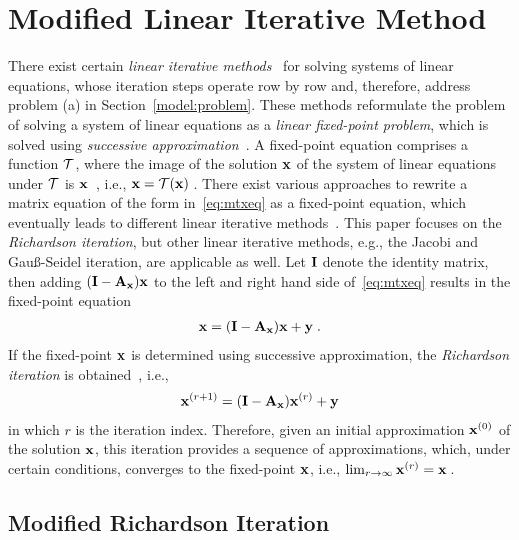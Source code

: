 \documentclass[10pt,twocolumn,twoside]{IEEEtran}
\begin{document}
\section{Modified Linear Iterative Method}
	\label{mlim}

There exist certain \emph{linear iterative methods}~\cite{kelley1995, isaacson1994, saad2003}
for solving systems of linear equations, whose iteration steps operate
row by row and, therefore, address problem (a) in Section~\ref{model:problem}.
These methods reformulate the problem of solving a system of linear
equations as a \emph{linear fixed-point problem}, which is solved using \emph{successive
approximation}~\cite{kelley1995}. A fixed-point equation comprises a function $\mathcal{T}$, where
the image of the solution $\bm{\mathrm{x}}$ of the system of linear equations under $\mathcal{T}$
is $\bm{\mathrm{x}}$~\cite{kelley1995}, i.e., $\bm{\mathrm{x}} = \mathcal{T}(\bm{\mathrm{x}})\:$.
There exist various approaches to rewrite a matrix equation of the form
in~\eqref{eq:mtxeq} as a fixed-point equation,
which eventually leads to different linear iterative methods~\cite{kelley1995,isaacson1994,saad2003}.
This paper focuses on the \emph{Richardson iteration},
but other linear iterative methods, e.g., the Jacobi and Gau\ss-Seidel iteration,
are applicable as well. Let $\bm{\mathrm{I}}$ denote the identity matrix, then
adding $(\bm{\mathrm{I}}-\bm{\mathrm{A}}_{\bm{\mathrm{x}}})\bm{\mathrm{x}}$ to the left and right hand side
of~\eqref{eq:mtxeq} results in the fixed-point equation
\begin{align}
	\bm{\mathrm{x}} = (\bm{\mathrm{I}}-\bm{\mathrm{A}}_{\bm{\mathrm{x}}})\bm{\mathrm{x}} + \bm{\mathrm{y}}\;.
	\label{eq:richitervec}
\end{align}
If the fixed-point $\bm{\mathrm{x}}$ is determined using successive approximation,
the \emph{Richardson iteration} is obtained~\cite{kelley1995}, i.e.,
\begin{align}
	\bm{\mathrm{x}}^{(r+1)} = (\bm{\mathrm{I}}-\bm{\mathrm{A}}_{\bm{\mathrm{x}}})\bm{\mathrm{x}}^{(r)} + \bm{\mathrm{y}}
	\label{eq:richiter}
\end{align}
in which $r$ is the iteration index.
Therefore, given an initial approximation $\bm{\mathrm{x}}^{(0)}$ of the solution $\bm{\mathrm{x}}$, this iteration
provides a sequence of approximations, which, under certain conditions, converges to the
fixed-point $\bm{\mathrm{x}}$, i.e., $\lim_{r\rightarrow\infty} \bm{\mathrm{x}}^{(r)} = \bm{\mathrm{x}}\:$.

\subsection{Modified Richardson Iteration}
\end{document}
